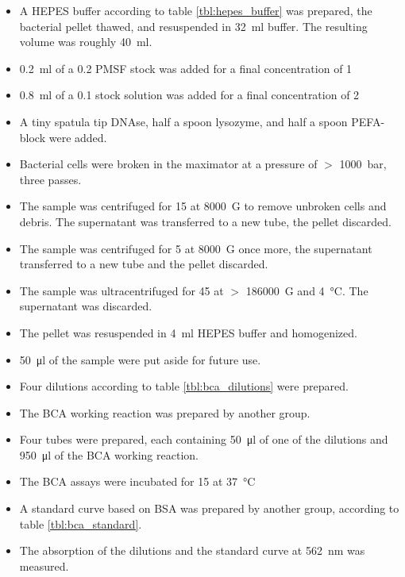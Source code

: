 \documentclass[a4paper]{scrreprt}
\begin{document}
\begin{itemize}
	\item A HEPES buffer according to table \ref{tbl:hepes_buffer} was
		prepared, the bacterial pellet thawed, and resuspended in
		\SI{32}{\ml} buffer. The resulting volume was roughly
		\SI{40}{\ml}.
	\item \SI{0.2}{\ml} of a \SI{0.2}{\Molar} PMSF stock was added for a
		final concentration of \SI{1}{\milli\Molar}
	\item \SI{0.8}{\ml} of a \SI{0.1}{\Molar}  stock solution was
		added for a final concentration of \SI{2}{\milli\Molar}
	\item A tiny spatula tip DNAse, half a spoon lysozyme, and half a spoon
		PEFA-block were added.
	\item Bacterial cells were broken in the maximator at a pressure of $>$
		\SI{1000}{\bar}, three passes.
	\item The sample was centrifuged for \SI{15}{\min} at \SI{8000}{G} to
		remove unbroken cells and debris. The supernatant was
		transferred to a new tube, the pellet discarded. 
	\item The sample was centrifuged for \SI{5}{\min} at \SI{8000}{G} once
		more, the supernatant transferred to a new tube and the pellet
		discarded.
	\item The sample was ultracentrifuged for \SI{45}{\min} at $>$
		\SI{186000}{G} and \SI{4}{\celsius}. The supernatant was
		discarded.
	\item The pellet was resuspended in \SI{4}{\ml} HEPES buffer and
		homogenized.
	\item \SI{50}{\ul} of the sample were put aside for future use.
	\item Four dilutions according to table \ref{tbl:bca_dilutions} were
		prepared.
	\item The BCA working reaction was prepared by another group.
	\item Four tubes were prepared, each containing \SI{50}{\ul} of one of
		the dilutions and \SI{950}{\ul} of the BCA working reaction.
	\item The BCA assays were incubated for \SI{15}{\min} at \SI{37}{\celsius}
	\item A standard curve based on BSA was prepared by another group,
		according to table \ref{tbl:bca_standard}.
	\item The absorption of the dilutions and the standard curve at
		\SI{562}{\nm} was measured. %
\end{itemize}
\end{document}

